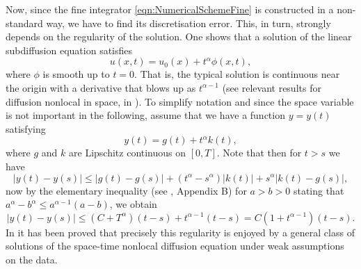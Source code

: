 \documentclass[12pt,a4paper]{article}
\begin{document}
Now, since the fine integrator \eqref{eqn:NumericalSchemeFine} is constructed in a non-standard way, we have to find its discretisation error. This, in turn, strongly depends on the regularity of the solution. One shows that a solution of the linear subdiffusion equation satisfies \cite{Sak11}
\begin{equation}
	u(x,t) = u_0(x) + t^\alpha \phi(x,t), 
\end{equation}
where $\phi$ is smooth up to $t=0$. That is, the typical solution is continuous near the origin with a derivative that blows up as $t^{\alpha-1}$ (see relevant results for diffusion nonlocal in space, in \cite{del2025numerical}). To simplify notation and since the space variable is not important in the following, assume that we have a function $y=y(t)$ satisfying
\begin{equation}
	y(t) = g(t) + t^\alpha k(t),
\end{equation}
where $g$ and $k$ are Lipschitz continuous on $[0,T]$. Note that then for $t>s$ we have
\begin{equation}
	|y(t) - y(s)| \leq |g(t) - g(s)| + \left(t^\alpha-s^\alpha\right) |k(t)| + s^\alpha |k(t) - g(s)|,
\end{equation}
now by the elementary inequality (see \cite{del2025numerical}, Appendix B) for $a>b>0$ stating that $a^\alpha-b^\alpha \leq a^{\alpha-1}(a-b)$, we obtain
\begin{equation}\label{eqn:DiffusionRegularity}
	|y(t) - y(s)| \leq (C+T^\alpha) (t-s) + t^{\alpha-1} (t-s) = C (1+t^{\alpha-1})(t-s).
\end{equation}
In \cite{del2025numerical} it has been proved that precisely this regularity is enjoyed by a general class of solutions of the space-time nonlocal diffusion equation under weak assumptions on the data.
\end{document}
